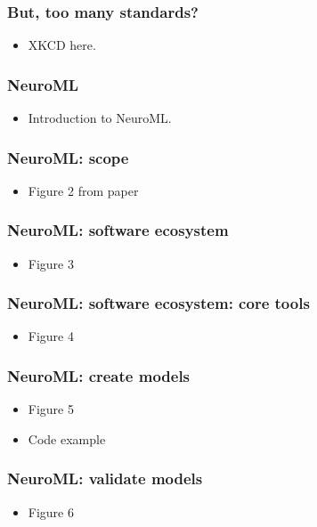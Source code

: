 \begin{frame}[c]
  \frametitle{But, too many standards?}
  \begin{itemize}
    \item XKCD here.
  \end{itemize}
\end{frame}
\begin{frame}[c]
  \frametitle{NeuroML}
  \begin{itemize}
    \item Introduction to NeuroML.
  \end{itemize}
\end{frame}
\begin{frame}[c]
  \frametitle{NeuroML: scope}
  \begin{itemize}
    \item Figure 2 from paper
  \end{itemize}
\end{frame}
\begin{frame}[c]
  \frametitle{NeuroML: software ecosystem}
  \begin{itemize}
    \item Figure 3
  \end{itemize}
\end{frame}
\begin{frame}[c]
  \frametitle{NeuroML: software ecosystem: core tools}
  \begin{itemize}
    \item Figure 4
  \end{itemize}
\end{frame}
\begin{frame}[c]
  \frametitle{NeuroML: create models}
  \begin{itemize}
    \item Figure 5
    \item Code example
  \end{itemize}
\end{frame}
\begin{frame}[c]
  \frametitle{NeuroML: validate models}
  \begin{itemize}
    \item Figure 6
  \end{itemize}
\end{frame}
